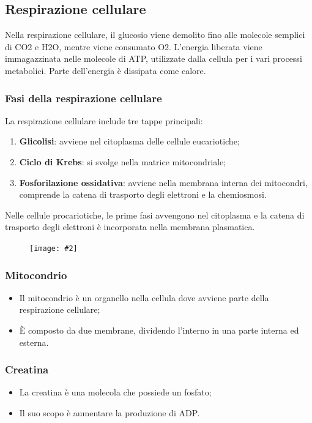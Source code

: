 \documentclass{article}
\newcommand{\cfig}[2]{
    \phantom{}
    \begin{figure}[ht!]
        \begin{center}
            \texttt{[image: \#2]}
        \end{center}
    \end{figure}
}
\begin{document}
\subsection{Respirazione cellulare}
Nella respirazione cellulare, il glucosio viene demolito fino alle molecole semplici di CO2 e
H2O, mentre viene consumato O2. L'energia liberata viene immagazzinata nelle molecole di ATP,
utilizzate dalla cellula per i vari processi metabolici. Parte dell'energia è dissipata come 
calore.

\subsubsection{Fasi della respirazione cellulare}
La respirazione cellulare include tre tappe principali:
\begin{enumerate}
    \item \textbf{Glicolisi}: avviene nel citoplasma delle cellule eucariotiche;
    \item \textbf{Ciclo di Krebs}: si svolge nella matrice mitocondriale;
    \item \textbf{Fosforilazione ossidativa}: avviene nella membrana interna dei mitocondri,
        comprende la catena di trasporto degli elettroni e la chemiosmosi.
\end{enumerate}

Nelle cellule procariotiche, le prime fasi avvengono nel citoplasma e la catena di trasporto
degli elettroni è incorporata nella membrana plasmatica.

\cfig{.8}{media/respirazione-cellulare.png}

\subsubsection{Mitocondrio}
\begin{itemize}
    \item Il mitocondrio è un organello nella cellula dove avviene parte della respirazione
        cellulare;
    \item È composto da due membrane, dividendo l'interno in una parte interna ed esterna.
\end{itemize}

\subsubsection{Creatina}
\begin{itemize}
    \item La creatina è una molecola che possiede un fosfato;
    \item Il suo scopo è aumentare la produzione di ADP.
\end{itemize}
\end{document}
